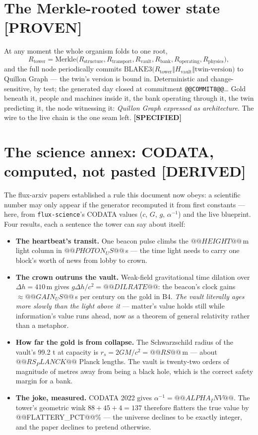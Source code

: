 \documentclass[11pt,a4paper]{article}
\newcommand{\claim}[1]{\textcolor{qsteel}{\textbf{\footnotesize[#1]}}}
\begin{document}
\section{The Merkle-rooted tower state \hfill \claim{PROVEN}}

At any moment the whole organism folds to one root,
\[
R_{\text{tower}} = \mathrm{Merkle}\big(R_{\text{structure}}, R_{\text{transport}},
R_{\text{vault}}, R_{\text{bank}}, R_{\text{operating}}, R_{\text{physics}}\big),
\]
and the full node periodically commits
$\mathrm{BLAKE3}\big(R_{\text{tower}} \Vert H_{\text{vault}} \Vert
\text{twin-version}\big)$ to Quillon Graph --- the twin's version is bound in.
Deterministic and change-sensitive, by test; the generated day closed at
commitment \texttt{@@COMMIT8@@}\ldots{} Gold beneath it, people and machines
inside it, the bank operating through it, the twin predicting it, the node
witnessing it: \emph{Quillon Graph expressed as architecture}. The wire to the
live chain is the one seam left. \claim{SPECIFIED}

\section{The science annex: CODATA, computed, not pasted \hfill \claim{DERIVED}}

The flux-arxiv papers established a rule this document now obeys: a scientific
number may only appear if the generator recomputed it from first constants ---
here, from \texttt{flux-science}'s CODATA values ($c$, $G$, $g$,
$\alpha^{-1}$) and the live blueprint. Four results, each a sentence the tower
can say about itself:

\begin{itemize}
\item \textbf{The heartbeat's transit.} One beacon pulse climbs the
$@@HEIGHT@@$\,m light column in $@@PHOTON_US@@$\,\textmu s --- the time light
needs to carry one block's worth of news from lobby to crown.
\item \textbf{The crown outruns the vault.} Weak-field gravitational time
dilation over $\Delta h = 410$\,m gives $g\Delta h/c^2 = @@DILRATE@@$: the
beacon's clock gains $\approx @@GAIN_US@@$\,\textmu s per century on the gold in
B4. \emph{The vault literally ages more slowly than the light above it} ---
matter's value holds still while information's value runs ahead, now as a
theorem of general relativity rather than a metaphor.
\item \textbf{How far the gold is from collapse.} The Schwarzschild radius of
the vault's 99.2 t at capacity is $r_s = 2GM/c^2 = @@RS@@$\,m --- about
$@@RS_PLANCK@@$ Planck lengths. The vault is twenty-two orders of magnitude of
metres away from being a black hole, which is the correct safety margin for a
bank.
\item \textbf{The joke, measured.} CODATA 2022 gives $\alpha^{-1} =
@@ALPHA_INV@@$. The tower's geometric wink $88+45+4 = 137$ therefore flatters
the true value by @@FLATTERY_PCT@@\% --- the universe declines to be exactly
integer, and the paper declines to pretend otherwise.
\end{itemize}
\end{document}
